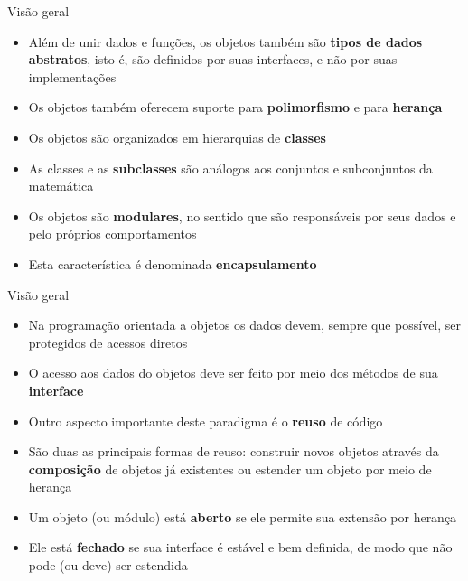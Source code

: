 \begin{frame}[fragile]{Visão geral}

    \begin{itemize}
        \item Além de unir dados e funções, os objetos também são \textbf{tipos de dados 
            abstratos}, isto é, são definidos por suas interfaces, e não por suas implementações

        \item Os objetos também oferecem suporte para \textbf{polimorfismo} e para \textbf{herança}

        \item Os objetos são organizados em hierarquias de \textbf{classes}

        \item As classes e as \textbf{subclasses} são análogos aos conjuntos e subconjuntos da
            matemática

        \item Os objetos são \textbf{modulares}, no sentido que são responsáveis por seus dados
            e pelo próprios comportamentos

        \item Esta característica é denominada \textbf{encapsulamento}
           
    \end{itemize}

\end{frame}

\begin{frame}[fragile]{Visão geral}

    \begin{itemize}
        \item Na programação orientada a objetos os dados devem, sempre que possível, ser protegidos
            de acessos diretos

        \item O acesso aos dados do objetos deve ser feito por meio dos métodos de sua
            \textbf{interface}
 
        \item Outro aspecto importante deste paradigma é o \textbf{reuso} de código

        \item São duas as principais formas de reuso: construir novos objetos através da
            \textbf{composição} de objetos já existentes ou estender um objeto por meio de 
            herança

        \item Um objeto (ou módulo) está \textbf{aberto} se ele permite sua extensão por herança

        \item Ele está \textbf{fechado} se sua interface é estável e bem definida, de modo que
            não pode (ou deve) ser estendida
    \end{itemize}

\end{frame}
